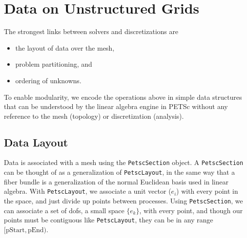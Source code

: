 \section{Data on Unstructured Grids} 

The strongest links between solvers and discretizations are
\begin{itemize}
  \item the layout of data over the mesh,
  \item problem partitioning, and
  \item ordering of unknowns.
\end{itemize}
To enable modularity, we encode the operations above in simple data structures that can be understood by the linear
algebra engine in PETSc without any reference to the mesh (topology) or discretization (analysis).

\subsection{Data Layout}

Data is associated with a mesh using the \lstinline{PetscSection} object. A \lstinline{PetscSection} can be thought of as a generalization of
\lstinline{PetscLayout}, in the same way that a fiber bundle is a generalization of the normal Euclidean basis used in linear
algebra. With \lstinline{PetscLayout}, we associate a unit vector ($e_i$) with every point in the space, and just divide up points
between processes. Using \lstinline{PetscSection}, we can associate a set of dofs, a small space $\{e_k\}$, with every point, and
though our points must be contiguous like \lstinline{PetscLayout}, they can be in any range $[\mathrm{pStart}, \mathrm{pEnd})$.

